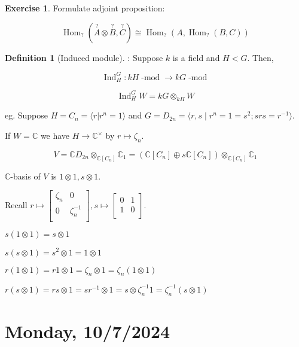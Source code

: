 \documentclass{article}
\theoremstyle{definition}
\newtheorem*{exercise}{Exercise}
\newtheorem*{definition}{Definition}
\newcommand{\Hom}{\operatorname{Hom}}
\begin{document}
\begin{exercise}
    Formulate adjoint proposition:

    \[
        \Hom_? (\overset{?}{A} \otimes \overset{?}{B} , \overset{?}{C}) \cong \Hom_? (A, \Hom_?(B,C))
    \]
\end{exercise}

\begin{definition}
    [Induced module]: Suppose \(k\) is a field and \(H < G\). Then,

    \[
        \operatorname{Ind}_H^G : kH\operatorname{-mod} \to kG \operatorname{-mod}
    \]

    \[
        \operatorname{Ind}_H^G W = kG \otimes_{kH} W
    \]
\end{definition}

eg. Suppose \(H = C_n = \langle r |r^n = 1 \rangle \) and \(G = D_{2n} = \langle r,s \mid r^n = 1 = s^2; srs = r ^{-1} \rangle \). 

If \(W = \mathbb{C}\) we have \(H \to \mathbb{C} ^\times \) by \(r \mapsto \zeta_n\).

\[
    V = \mathbb{C} D_{2n} \otimes_{\mathbb{C} [C_n]} \mathbb{C}_1 = (\mathbb{C} [C_n] \oplus s \mathbb{C} [C_n]) \otimes_{\mathbb{C}[C_n]} \mathbb{C} _1
\]

\(\mathbb{C}\)-basis of \(V\) is \(1 \otimes 1, s \otimes 1\).

Recall \(r \mapsto \begin{bmatrix}
    \zeta_n &  0 \\
    0 &  \zeta_n ^{-1} \\
\end{bmatrix}, s \mapsto \begin{bmatrix}
    0 &  1 \\
    1 &  0 \\
\end{bmatrix}\).

\(s(1 \otimes 1) = s \otimes 1\)

\(s(s \otimes 1) = s^2 \otimes 1 = 1 \otimes 1\) 

\(r(1 \otimes 1) = r1 \otimes 1 = \zeta_n \otimes 1 = \zeta_n(1 \otimes 1)\) 

\(r(s \otimes 1) = rs \otimes 1 = s r ^{-1} \otimes 1 = s \otimes \zeta_n ^{-1} 1 = \zeta_n ^{-1} (s \otimes 1)\) 

\section*{Monday, 10/7/2024}
\end{document}
